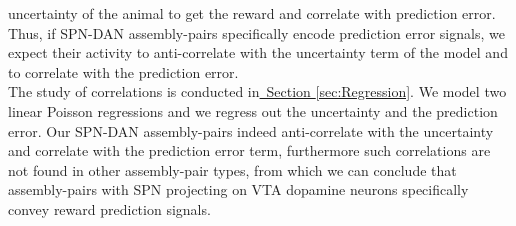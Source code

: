 uncertainty of the animal to get the reward and correlate with prediction error.\\Thus, if SPN-DAN assembly-pairs specifically encode prediction error signals, we expect their activity to anti-correlate with the uncertainty term of the model and to correlate with the prediction error.\\The study of correlations is conducted in\hyperref[sec:Regression]{~Section \ref*{sec:Regression}}. We model two linear Poisson regressions and we regress out the uncertainty and the prediction error. Our SPN-DAN assembly-pairs indeed anti-correlate with the uncertainty and correlate with the prediction error term, furthermore such correlations are not found in other assembly-pair types, from which we can conclude that assembly-pairs with SPN projecting on VTA dopamine neurons specifically convey reward prediction signals.  